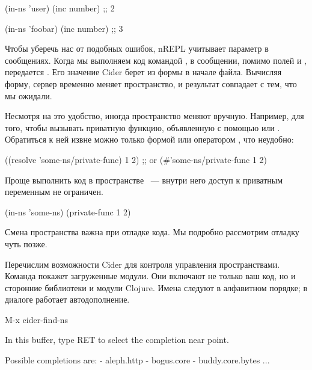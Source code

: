 \begin{english}
  \begin{clojure}
(in-ns 'user)
(inc number) ;; 2

(in-ns 'foobar)
(inc number) ;; 3
  \end{clojure}
\end{english}

Чтобы уберечь нас от подобных ошибок, nREPL учитывает параметр  в сообщениях. Когда мы выполняем код командой , в сообщении, помимо полей  и , передается . Его значение Cider берет из формы  в начале файла. Вычисляя форму, сервер временно меняет пространство, и результат совпадает с тем, что мы ожидали.

Несмотря на это удобство, иногда пространство меняют вручную. Например, для того, чтобы вызывать приватную функцию, объявленную с помощью  или . Обратиться к ней извне можно только формой  или оператором , что неудобно:

\begin{english}
  \begin{clojure}
((resolve 'some-ns/private-func) 1 2)
;; or
(#'some-ns/private-func 1 2)
  \end{clojure}
\end{english}

Проще выполнить код в пространстве ~--- внутри него доступ к приватным переменным не ограничен.

\begin{english}
  \begin{clojure}
(in-ns 'some-ns)
(private-func 1 2)
  \end{clojure}
\end{english}

Смена пространства важна при отладке кода. Мы подробно рассмотрим отладку чуть позже.

Перечислим возможности Cider для контроля управления пространствами. Команда  покажет загруженные модули. Они включают не только ваш код, но и сторонние библиотеки и модули Clojure. Имена следуют в алфавитном порядке; в диалоге работает автодополнение.

\begin{english}
  \begin{text}
M-x cider-find-ns

In this buffer, type RET to select the completion
near point.

Possible completions are:
- aleph.http
- bogus.core
- buddy.core.bytes
...
  \end{text}
\end{english}

